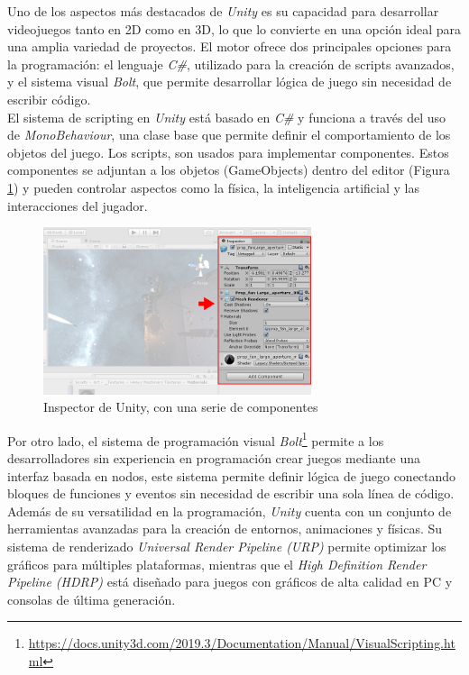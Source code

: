 Uno de los aspectos más destacados de \textit{Unity} es su capacidad para desarrollar videojuegos tanto en 2D como en 3D, lo que lo convierte en una opción ideal para una amplia variedad de proyectos. El motor ofrece dos principales opciones para la programación: el lenguaje \textit{C\#}, utilizado para la creación de scripts avanzados, y el sistema visual \textit{Bolt}, que permite desarrollar lógica de juego sin necesidad de escribir código.\\

El sistema de scripting en \textit{Unity} está basado en \textit{C\#} y funciona a través del uso de \textit{MonoBehaviour}, una clase base que permite definir el comportamiento de los objetos del juego. Los scripts, son usados para implementar componentes. Estos componentes se adjuntan a los objetos (GameObjects) dentro del editor (Figura \ref{fig:Unity_Inspector}) y pueden controlar aspectos como la física, la inteligencia artificial y las interacciones del jugador.\\

\begin{figure}[t]
	\centering
	\includegraphics[width = 0.7\textwidth]{Imagenes/InspectorWindowCallout.png}
	\caption{Inspector de Unity, con una serie de componentes}
	\label{fig:Unity_Inspector}
\end{figure}

Por otro lado, el sistema de programación visual \textit{Bolt}\footnote{\url{https://docs.unity3d.com/2019.3/Documentation/Manual/VisualScripting.html}} permite a los desarrolladores sin experiencia en programación crear juegos mediante una interfaz basada en nodos, este sistema permite definir lógica de juego conectando bloques de funciones y eventos sin necesidad de escribir una sola línea de código.\\

Además de su versatilidad en la programación, \textit{Unity} cuenta con un conjunto de herramientas avanzadas para la creación de entornos, animaciones y físicas. Su sistema de renderizado \textit{Universal Render Pipeline (URP)} permite optimizar los gráficos para múltiples plataformas, mientras que el \textit{High Definition Render Pipeline (HDRP)} está diseñado para juegos con gráficos de alta calidad en PC y consolas de última generación.\\

